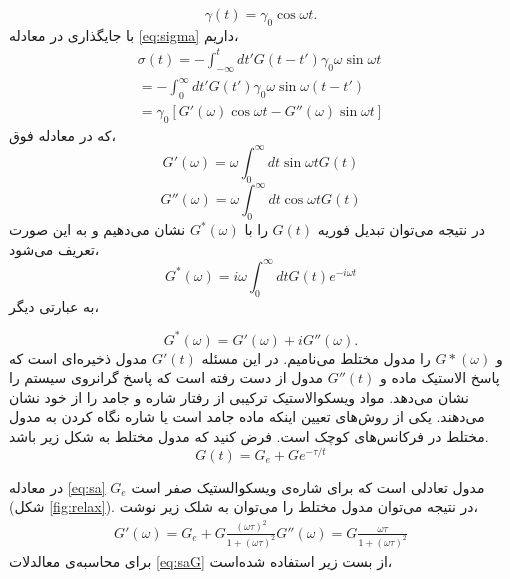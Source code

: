\begin{equation}
\gamma(t)=\gamma_0\cos\omega t.
\end{equation}
با جایگذاری در معادله \ref{eq:sigma} داریم،
\begin{equation}
\begin{aligned}
\sigma(t)=-\int_{-\infty}^tdt'G(t-t')\gamma_0\omega\sin\omega t\\
	      =-\int_0^\infty dt'G(t')\gamma_0\omega\sin\omega (t-t')\\
	      =\gamma_0\left[G'(\omega)\cos\omega t-G''(\omega)\sin\omega t\right]
\end{aligned}
\end{equation}
که در معادله فوق،
\begin{equation}
G'(\omega)=\omega\int_0^\infty dt\sin\omega t G(t)
\end{equation}
\begin{equation}
G''(\omega)=\omega\int_0^\infty dt\cos\omega t G(t)
\end{equation}
در نتیجه می‌توان تبدیل فوریه $G(t)$ را با $G^*(\omega)$ نشان می‌دهیم و به این صورت تعریف می‌شود،
\begin{equation}
G^*(\omega)=i\omega\int_0^\infty dtG(t)e^{-i\omega t}
\end{equation}
به عبارتی دیگر، 

\begin{equation}
G^*(\omega)=G'(\omega)+iG''(\omega).
\label{eq:g*}
\end{equation}
و  $G*(\omega)$ را مدول مختلط می‌نامیم. در این مسئله $G'(t)$  مدول ذخیره‌ای است که پاسخ الاستیک ماده و $G''(t)$ مدول از دست رفته است که پاسخ گرانروی سیستم را نشان می‌دهد. مواد ویسکوالاستیک ترکیبی از رفتار‌ شاره و جامد را از خود نشان می‌دهند. یکی از روش‌های تعیین اینکه ماده جامد است یا شاره نگاه کردن به مدول مختلط در فرکانس‌های کوچک است. فرض کنید که مدول مختلط به شکل زیر باشد.
\begin{equation}
G(t)=G_e+Ge^{-\tau/t}
\label{eq:sa}
\end{equation}

در معادله \ref{eq:sa} $G_e$ مدول تعادلی است که برای شاره‌‌ی ویسکوالستیک صفر است (شکل \ref{fig:relax}). در نتیجه می‌توان مدول مختلط را می‌توان به شلک زیر نوشت،
\begin{equation}
\begin{aligned}
G'(\omega)=G_e+G\frac{(\omega\tau)^2}{1+(\omega\tau)^2}
G''(\omega)=G\frac{\omega\tau}{1+(\omega\tau)^2}
\label{eq:saG}
\end{aligned}
\end{equation}
برای محاسبه‌ی معالدلات \ref{eq:saG} از بست زیر استفاده شده‌است،

